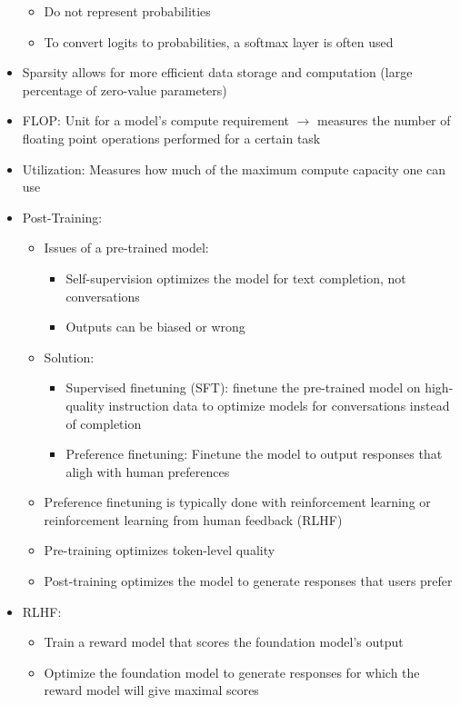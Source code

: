 \documentclass[11pt]{scrartcl}
\begin{document}
\begin{itemize}
\begin{itemize}
		\item Do not represent probabilities
		\item To convert logits to probabilities, a softmax layer is often used
	\end{itemize}
	\item Sparsity allows for more efficient data storage and computation (large percentage of zero-value parameters)
	\item FLOP: Unit for a model's compute requirement $\to$ measures the number of floating point operations performed for a certain task
	\item Utilization: Measures how much of the maximum compute capacity one can use
	\item Post-Training:
	\begin{itemize}
		\item Issues of a pre-trained model: 
		\begin{itemize}
			\item Self-supervision optimizes the model for text completion, not conversations
			\item Outputs can be biased or wrong
		\end{itemize}
		\item Solution:
		\begin{itemize}
			\item Supervised finetuning (SFT): finetune the pre-trained model on high-quality instruction data to optimize models for conversations instead of completion
			\item Preference finetuning: Finetune the model to output responses that aligh with human preferences
		\end{itemize}
		\item Preference finetuning is typically done with reinforcement learning or reinforcement learning from human feedback (RLHF)
		\item Pre-training optimizes token-level quality
		\item Post-training optimizes the model to generate responses that users prefer
	\end{itemize}
	\item RLHF:
	\begin{itemize}
		\item Train a reward model that scores the foundation model's output
		\item Optimize the foundation model to generate responses for which the reward model will give maximal scores
	\end{itemize}

\end{itemize}
\end{document}
